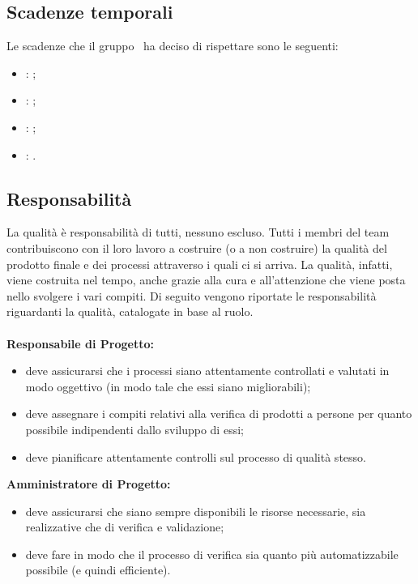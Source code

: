 \documentclass[../PianoDiQualifica.tex]{subfiles}
\begin{document}
	\subsection{Scadenze temporali}
	Le scadenze che il gruppo \leaf\ ha deciso di rispettare sono le seguenti:
	\begin{itemize}
		\item \revisionedeirequisiti: ;
		\item \revisionediprogettazione: ;
		\item \revisionediqualifica: ;
		\item \revisionediaccettazione: .
	\end{itemize}
	\subsection{Responsabilità}
		La qualità è responsabilità di tutti, nessuno escluso. Tutti i membri del team contribuiscono con il loro lavoro a costruire (o a non costruire) la qualità del prodotto finale e dei processi attraverso i quali ci si arriva. La qualità, infatti, viene costruita nel tempo, anche grazie alla cura e all'attenzione che viene posta nello svolgere i vari compiti.
		Di seguito vengono riportate le responsabilità riguardanti la qualità, catalogate in base al ruolo.
		\\\\\textbf{Responsabile di Progetto:}
			 \begin{itemize}
				\item deve assicurarsi che i processi siano attentamente controllati e valutati in modo oggettivo (in modo tale che essi siano migliorabili);
				\item deve assegnare i compiti relativi alla verifica di prodotti a persone per quanto possibile indipendenti dallo sviluppo di essi;
				\item deve pianificare attentamente controlli sul processo di qualità stesso.
			\end{itemize}
 			\textbf{Amministratore di Progetto:}
			\begin{itemize}
				\item deve assicurarsi che siano sempre disponibili le risorse necessarie, sia realizzative che di verifica e validazione;
				\item deve fare in modo che il processo di verifica sia quanto più automatizzabile possibile (e quindi efficiente).
			\end{itemize}
\end{document}
